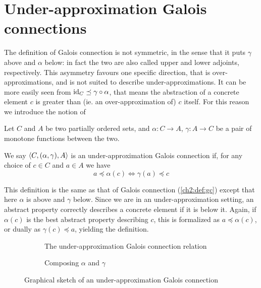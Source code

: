 \section{Under-approximation Galois connections}
The definition of Galois connection is not symmetric, in the sense that it puts $\gamma$ above and $\alpha$ below: in fact the two are also called upper and lower adjoints, respectively. This asymmetry favours one specific direction, that is over-approximations, and is not suited to describe under-approximations. It can be more easily seen from $\text{id}_C \preceq \gamma \circ \alpha$, that means the abstraction of a concrete element $c$ is greater than (ie. an over-approximation of) $c$ itself. For this reason we introduce the notion of
\begin{definition}\label{ch2:def:under-gc}
	Let $C$ and $A$ be two partially ordered sets, and $\alpha : C \rightarrow A$, $\gamma : A \rightarrow C$ be a pair of monotone functions between the two.

	We say $\langle C, (\alpha, \gamma), A \rangle$ is an under-approximation Galois connection if, for any choice of $c \in C$ and $a \in A$ we have
	\[
	a \preceq \alpha(c) \iff \gamma(a) \preceq c
	\]
\end{definition}
This definition is the same as that of Galois connection (\ref{ch2:def:gc}) except that here $\alpha$ is above and $\gamma$ below. Since we are in an under-approximation setting, an abstract property correctly describes a concrete element if it is below it. Again, if $\alpha(c)$ is the best abstract property describing $c$, this is formalized as $a \preceq \alpha(c)$, or dually as $\gamma(c) \preceq a$, yielding the definition.
\begin{figure}[ht]
	\centering
	\begin{subfigure}{.5\textwidth}
		\centering
		{
			\selectfont
			\def\svgwidth{.8\textwidth}
			
		}
		\caption{The under-approximation Galois connection relation}
		\label{ch2:fig:ugc-sketch:relation}
	\end{subfigure}%
	\begin{subfigure}{.5\textwidth}
		\centering
		{
			\selectfont
			\def\svgwidth{.8\textwidth}
			
		}
		\caption{Composing $\alpha$ and $\gamma$}
		\label{ch2:fig:ugc-sketch:gamma-alpha-c}
	\end{subfigure}
	\caption{Graphical sketch of an under-approximation Galois connection}
	\label{ch2:fig:ugc-sketch}
\end{figure}

